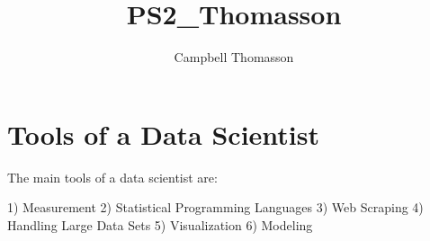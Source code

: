 \documentclass{article}
\title{PS2_Thomasson}
\author{Campbell Thomasson}
\begin{document}
\maketitle

\section{Tools of a Data Scientist}

The main tools of a data scientist are:

1) Measurement
2) Statistical Programming Languages
3) Web Scraping
4) Handling Large Data Sets
5) Visualization
6) Modeling
\end{document}
